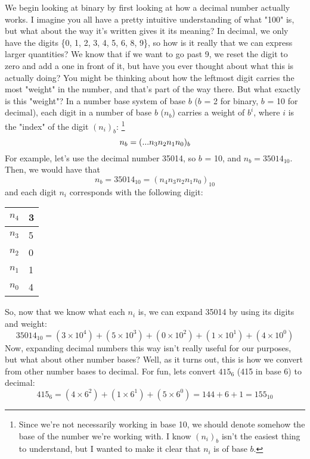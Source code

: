 \documentclass[11pt]{article}
\begin{document}
We begin looking at binary by first looking at how a decimal number actually works. I imagine you all have a pretty intuitive understanding of what "100" is, but what about the way it's written gives it its meaning?
In decimal, we only have the digits \{0, 1, 2, 3, 4, 5, 6, 8, 9\}, so how is it really that we can express larger quantities? 
We know that if we want to go past 9, we reset the digit to zero and add a one in front of it, but have you ever thought about what this is actually doing?
You might be thinking about how the leftmost digit carries the most "weight" in the number, and that's part of the way there. 
But what exactly is this "weight"?
In a number base system of base $b$ ($b$ = 2 for binary, $b$ = 10 for decimal), each digit in a number of base $b$ ($n_b$) carries a weight of $b^{i}$, where $i$ is the "index" of the digit $(n_{i})_b$:
\footnote{Since we're not necessarily working in base 10, we should denote somehow the base of the number we're working with. I know $(n_{i})_b$ isn't the easiest thing to understand, but I wanted to make it clear that $n_i$ is of base $b$.}
$$ n_b = (... \space n_3 n_2 n_1 n_0)_b $$
For example, let's use the decimal number 35014, so $b$ = 10, and $n_b = 35014_{10}$. Then, we would have that
$$n_{b} = 35014_{10}  = (n_4n_3n_2n_1n_0)_{10}$$
and each digit $n_i$ corresponds with the following digit:

\begin{table}[h!]
    \centering
    \begin{tabular}{|l|l|}
    \hline
    $n_4$ & 3 \\ \hline
    $n_3$ & 5 \\ \hline
    $n_2$ & 0 \\ \hline
    $n_1$ & 1 \\ \hline
    $n_0$ & 4 \\ \hline
    \end{tabular}
\end{table}

\noindent 
So, now that we know what each $n_i$ is, we can expand 35014 by using its digits and weight:
$$ 35014_{10} = (3\times 10^{4}) + (5 \times 10^{3}) + (0 \times 10^{2}) + (1 \times 10^{1}) + (4 \times 10^{0})$$
Now, expanding decimal numbers this way isn't really useful for our purposes, but what about other number bases?
Well, as it turns out, this is how we convert from other number bases to decimal.
For fun, lets convert $415_6$ (415 in base 6) to decimal:
$$ 415_6 = ( 4\times 6^{2} ) + ( 1\times 6^{1}) + ( 5\times 6^{0}) = 144 + 6 + 1 = 155_{10} $$
\end{document}
